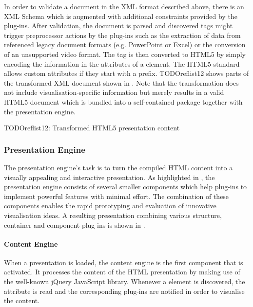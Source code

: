 \documentclass[a4paper,12pt]{report}
\begin{document}
     In order to validate a \mxp document in the XML format described above,
     there is an XML Schema which is augmented with additional constraints
     provided by the plug-ins. After validation, the document is parsed and
     discovered tags might trigger preprocessor actions by the plug-ins such as
     the extraction of data from referenced legacy document formats (e.g.
     PowerPoint or Excel) or the conversion of an unsupported video format. The
     tag is then converted to HTML5 by simply encoding the information in the
     attributes of a  element. The HTML5 standard allows custom
     attributes if they start with a  prefix. TODOreflist12 shows
     parts of the transformed XML document shown in . Note that
     the transformation does not include visualisation-specific information but
     merely results in a valid HTML5 document which is bundled into a
     self-contained package together with the presentation engine.

     TODOreflist12: Transformed HTML5 presentation content

    \subsubsection{Presentation Engine}

     The presentation engine's task is to turn the compiled HTML content into a
     visually appealing and interactive presentation. As highlighted in
     , the presentation engine consists of several
     smaller components which help plug-ins to implement powerful features with
     minimal effort. The combination of these components enables the rapid
     prototyping and evaluation of innovative visualisation ideas. A resulting
     \mxp presentation combining various structure, container and component
     plug-ins is shown in .


     \paragraph{Content Engine} When a presentation is loaded, the content
      engine is the first component that is activated. It processes the content
      of the HTML presentation by making use of the well-known jQuery
      JavaScript library. Whenever a  element is discovered, the
       attribute is read and the corresponding plug-ins are
      notified in order to visualise the content.
\end{document}
